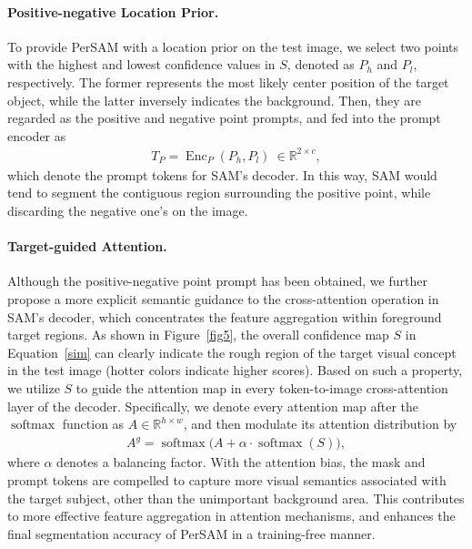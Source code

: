 \documentclass{article} \usepackage{iclr2024_conference,times}
\begin{document}
\paragraph{Positive-negative Location Prior.}
To provide PerSAM with a location prior on the test image, we select two points with the highest and lowest confidence values in $S$, denoted as $P_h$ and $P_l$, respectively. The former represents the most likely center position of the target object, while the latter inversely indicates the background. Then, they are regarded as the positive and negative point prompts, and fed into the prompt encoder as
\begin{align}
    T_P = \operatorname{Enc}_P(P_h, P_l)\ \in \mathbb{R}^{2\times c},
\end{align}
which denote the prompt tokens for SAM's decoder.
In this way, SAM would tend to segment the contiguous region surrounding the positive point, while discarding the negative one's on the image.


\paragraph{Target-guided Attention.}
Although the positive-negative point prompt has been obtained, we further propose a more explicit semantic guidance to the cross-attention operation in SAM's decoder, which concentrates the feature aggregation within foreground target regions.
As shown in Figure~\ref{fig5}, the overall confidence map $S$ in Equation~\ref{sim} can clearly indicate the rough region of the target visual concept in the test image (hotter colors indicate higher scores). Based on such a property, we utilize $S$ to guide the attention map in every token-to-image cross-attention layer of the decoder. Specifically, we denote every attention map after the $\operatorname{softmax}$ function as $A\in \mathbb{R}^{h\times w}$, and then modulate its attention distribution by
\begin{align}
    A^g = \operatorname{softmax}\Big(A + \alpha\cdot\operatorname{softmax}(S)\Big),
\label{alpha}
\end{align}
where $\alpha$ denotes a balancing factor. With the attention bias, the mask and prompt tokens are compelled to capture more visual semantics associated with the target subject, other than the unimportant background area.
This contributes to more effective feature aggregation in attention mechanisms, and enhances the final segmentation accuracy of PerSAM in a training-free manner.
\end{document}
